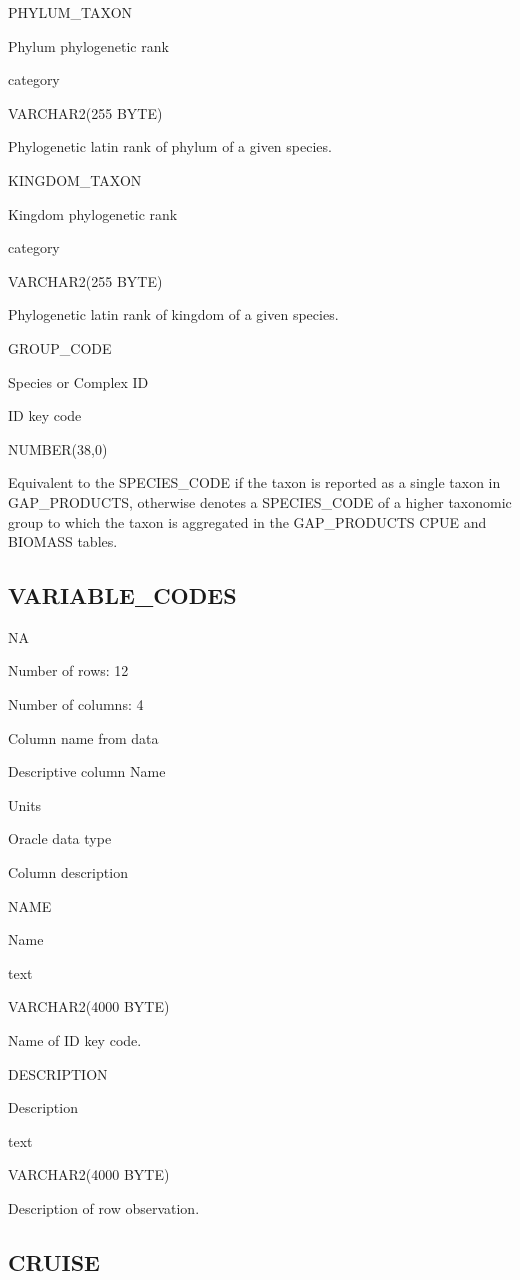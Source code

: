 \documentclass[
  letterpaper,
  oneside,
  open=any]{scrbook}
\begin{document}
PHYLUM\_TAXON

Phylum phylogenetic rank

category

VARCHAR2(255 BYTE)

Phylogenetic latin rank of phylum of a given species.

KINGDOM\_TAXON

Kingdom phylogenetic rank

category

VARCHAR2(255 BYTE)

Phylogenetic latin rank of kingdom of a given species.

GROUP\_CODE

Species or Complex ID

ID key code

NUMBER(38,0)

Equivalent to the SPECIES\_CODE if the taxon is reported as a single
taxon in GAP\_PRODUCTS, otherwise denotes a SPECIES\_CODE of a higher
taxonomic group to which the taxon is aggregated in the GAP\_PRODUCTS
CPUE and BIOMASS tables.

\subsection{VARIABLE\_CODES}\label{variable_codes}

NA

Number of rows: 12

Number of columns: 4

Column name from data

Descriptive column Name

Units

Oracle data type

Column description

NAME

Name

text

VARCHAR2(4000 BYTE)

Name of ID key code.

DESCRIPTION

Description

text

VARCHAR2(4000 BYTE)

Description of row observation.

\subsection{CRUISE}\label{cruise}
\end{document}
